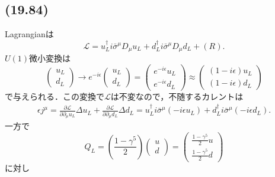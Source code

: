 \subsection{(19.84)}
Lagrangianは
\[
\mathcal{L} = u_L^\dagger i \bar\sigma^\mu D_\mu u_L + d_L^\dagger i \bar\sigma^\mu D_\mu d_L + (R) .
\]
$U(1)$微小変換は
\[
\begin{pmatrix}
  u_L \\ d_L
\end{pmatrix}
\to e^{-i\epsilon}
\begin{pmatrix}
  u_L \\ d_L
\end{pmatrix}
=
\begin{pmatrix}
  e^{-i\epsilon} u_L \\ e^{-i\epsilon} d_L
\end{pmatrix}
\approx
\begin{pmatrix}
  (1-i\epsilon) u_L \\ (1-i\epsilon) d_L
\end{pmatrix}
\]
で与えられる．この変換で$\mathcal{L}$は不変なので，不随するカレントは
\begin{align*}
  \epsilon j^\mu = \frac{\partial\mathcal{L}}{\partial \partial_\mu u_L} \Delta u_L
  + \frac{\partial\mathcal{L}}{\partial \partial_\mu d_L} \Delta d_L
  = u_L^\dagger i \bar\sigma^\mu (-i\epsilon u_L) + d_L^\dagger i \bar\sigma^\mu (-i\epsilon d_L) .
\end{align*}
一方で
\[
Q_L = \left( \frac{1-\gamma^5}{2} \right)
\begin{pmatrix}
  u \\ d
\end{pmatrix}
= \begin{pmatrix}
   \frac{1-\gamma^5}{2} u \\ \frac{1-\gamma^5}{2} d
\end{pmatrix}
\]
に対し
